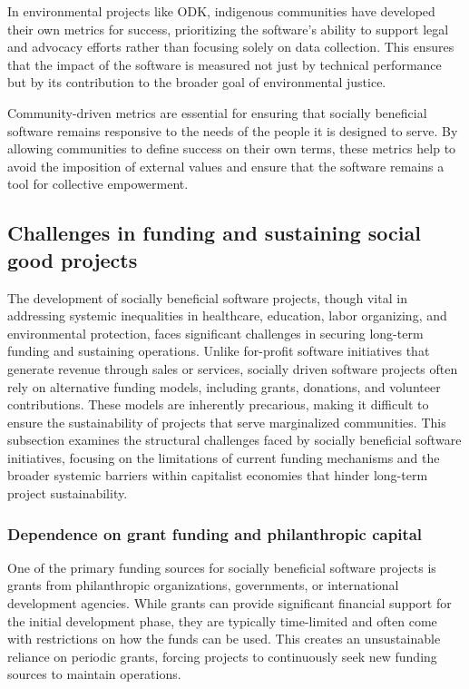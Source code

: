 \begin{refsection}
In environmental projects like ODK, indigenous communities have developed their own metrics for success, prioritizing the software’s ability to support legal and advocacy efforts rather than focusing solely on data collection. This ensures that the impact of the software is measured not just by technical performance but by its contribution to the broader goal of environmental justice.

Community-driven metrics are essential for ensuring that socially beneficial software remains responsive to the needs of the people it is designed to serve. By allowing communities to define success on their own terms, these metrics help to avoid the imposition of external values and ensure that the software remains a tool for collective empowerment.

\subsection{Challenges in funding and sustaining social good projects}

The development of socially beneficial software projects, though vital in addressing systemic inequalities in healthcare, education, labor organizing, and environmental protection, faces significant challenges in securing long-term funding and sustaining operations. Unlike for-profit software initiatives that generate revenue through sales or services, socially driven software projects often rely on alternative funding models, including grants, donations, and volunteer contributions. These models are inherently precarious, making it difficult to ensure the sustainability of projects that serve marginalized communities. This subsection examines the structural challenges faced by socially beneficial software initiatives, focusing on the limitations of current funding mechanisms and the broader systemic barriers within capitalist economies that hinder long-term project sustainability.

\subsubsection{Dependence on grant funding and philanthropic capital}

One of the primary funding sources for socially beneficial software projects is grants from philanthropic organizations, governments, or international development agencies. While grants can provide significant financial support for the initial development phase, they are typically time-limited and often come with restrictions on how the funds can be used. This creates an unsustainable reliance on periodic grants, forcing projects to continuously seek new funding sources to maintain operations.


\end{refsection}
